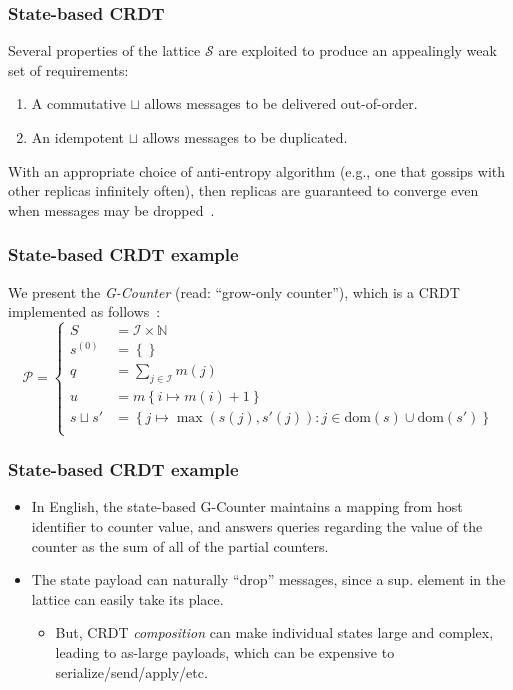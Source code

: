 \documentclass[aspectratio=169,compress]{beamer}
\begin{document}
  \begin{frame}
    \frametitle{State-based CRDT}

    Several properties of the lattice $\mathcal{S}$ are exploited to produce an
    appealingly weak set of requirements:
    \begin{enumerate}
      \item A commutative $\sqcup$ allows messages to be delivered out-of-order.
      \item An idempotent $\sqcup$ allows messages to be duplicated.
    \end{enumerate}

    With an appropriate choice of anti-entropy algorithm (e.g., one that gossips
    with other replicas infinitely often), then replicas are guaranteed to
    converge even when messages may be dropped~\citep{shapiro11}.
  \end{frame}

  \begin{frame}
    \frametitle{State-based CRDT example}

    We present the \textit{G-Counter} (read: ``grow-only counter''), which is a
    CRDT implemented as follows~\citep{almeida16}:
    \[
      \mathcal{P} = \left\{\begin{aligned}
        S &= \mathcal{I} \times \mathbb{N} \\
        s^{(0)} &= \left\{ \right\} \\
        q &= \sum_{j \in \mathcal{I}} m(j) \\
        u &= m\left\{ i \mapsto m(i) + 1 \right\} \\
        s \sqcup s' &= \left\{ j \mapsto \max(s(j), s'(j)) : j \in \text{dom}(s)
        \cup \text{dom}(s') \right\} \\
      \end{aligned}\right.
    \]
  \end{frame}

  \begin{frame}
    \frametitle{State-based CRDT example}

    \begin{itemize}
      \item In English, the state-based G-Counter maintains a mapping from host
        identifier to counter value, and answers queries regarding the value of
        the counter as the sum of all of the partial counters.
      \item The state payload can naturally ``drop'' messages, since a sup.
        element in the lattice can easily take its place.
        \begin{itemize}
          \item But, CRDT \textit{composition} can make individual states large
            and complex, leading to as-large payloads, which can be expensive to
            serialize/send/apply/etc.
        \end{itemize}
    \end{itemize}
  \end{frame}
\end{document}
